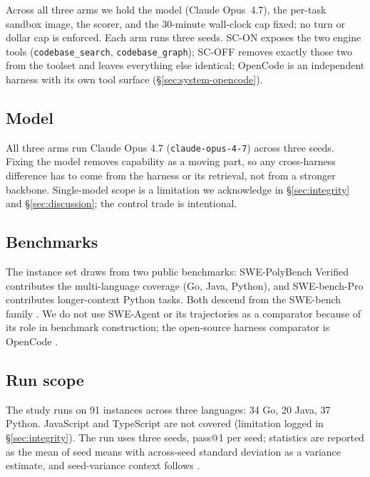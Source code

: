 Across all three arms we hold the model (Claude Opus~4.7), the per-task sandbox image, the scorer, and the 30-minute wall-clock cap fixed; no turn or dollar cap is enforced. Each arm runs three seeds. SC-ON exposes the two engine tools (\texttt{codebase\_search}, \texttt{codebase\_graph}); SC-OFF removes exactly those two from the toolset and leaves everything else identical; OpenCode is an independent harness with its own tool surface (\S\ref{sec:system-opencode}).

\subsection{Model}
\label{sec:design-model}

All three arms run Claude Opus 4.7 \citep{claudeopus47} (\texttt{claude-opus-4-7}) across three seeds. Fixing the
model removes capability as a moving part, so any cross-harness difference has to come
from the harness or its retrieval, not from a stronger backbone. Single-model scope is a
limitation we acknowledge in \S\ref{sec:integrity} and \S\ref{sec:discussion}; the
control trade is intentional.

\subsection{Benchmarks}
\label{sec:design-benchmarks}

The instance set draws from two public benchmarks: SWE-PolyBench Verified
\citep{swepolybench2025} contributes the multi-language coverage (Go, Java, Python), and
SWE-bench-Pro \citep{swebenchpro2025} contributes longer-context Python tasks. Both
descend from the SWE-bench family \citep{swebenchverified2024}. We do not use SWE-Agent
or its trajectories as a comparator because of its role in benchmark construction; the
open-source harness comparator is OpenCode \citep{opencode2025}.

\subsection{Run scope}
\label{sec:design-scope}

The study runs on 91 instances across three languages: 34 Go, 20 Java, 37
Python. JavaScript and TypeScript are not covered (limitation logged in
\S\ref{sec:integrity}). The run uses three seeds, pass@1 per seed; statistics are
reported as the mean of seed means with across-seed standard deviation as a variance
estimate, and seed-variance context follows \citep{bjarnason2026randomness}.

